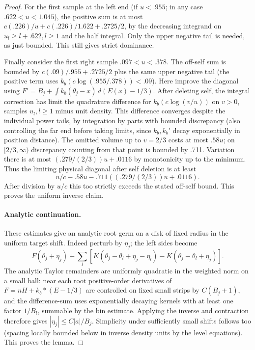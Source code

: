 \documentclass[11pt]{article}
\numberwithin{equation}{section}
\theoremstyle{definition}\newtheorem{definition}[theorem]{Definition}
\theoremstyle{remark}\newtheorem{remark}[theorem]{Remark}
\begin{document}
\begin{proof}
For the first sample at the left end (if \(u<.955\); in any case \(.622<u<1.045\)), the positive sum is at most \(c(.226)/u+c(.226)/1.622+.2725/2\), by the decreasing integrand on \(u_l\ge l+.622, l\ge1\) and the half integral. Only the upper negative tail is needed, as just bounded. This still gives strict dominance.

Finally consider the first right sample \(.097<u<.378\). The off-self sum is bounded by \(c(.09)/.955+.2725/2\) plus the same upper negative tail (the positive term uses \(k_b(c\log(.955/.378))<.09\)). Here improve the diagonal using
\(F'=B_j+\int k_b(\theta_j-x)\,d(E(x)-1/3)\).
After deleting self, the integral correction has limit the quadrature difference for \(k_b(c\log(v/u))\) on \(v>0\), samples \(u_l,l\ge1\) minus unit density. This difference converges despite the individual power tails, by integration by parts with bounded discrepancy (also controlling the far end before taking limits, since \(k_b,k_b'\) decay exponentially in position distance). The omitted volume up to \(v=2/3\) costs at most \(.58u\); on \([2/3,\infty)\) discrepancy counting from that point is bounded by .711. Variation there is at most \((.279/(2/3))u+.0116\) by monotonicity up to the minimum. Thus the limiting physical diagonal after self deletion is at least
\[
 u/c-.58u-.711((.279/(2/3))u+.0116).
\]
After division by \(u/c\) this too strictly exceeds the stated off-self bound. This proves the uniform inverse claim.

\paragraph{Analytic continuation.}
These estimates give an analytic root germ on a disk of fixed radius in the uniform target shift. Indeed perturb by \(\eta_j\); the left sides become
\[
 F(\theta_j+\eta_j)+
 \sum_l [K(\theta_j-\theta_l+\eta_j-\eta_l)-K(\theta_j-\theta_l+\eta_j)].
\]
The analytic Taylor remainders are uniformly quadratic in the weighted norm on a small ball: near each root positive-order derivatives of \(F=nH+k_b*(E-1/3)\) are controlled on fixed small strips by \(C(B_j+1)\), and the difference-sum uses exponentially decaying kernels with at least one factor \(1/B_l\), summable by the bin estimate. Applying the inverse and contraction therefore gives \(|\eta_j|\le C|a|/B_j\). Simplicity under sufficiently small shifts follows too (spacing locally bounded below in inverse density units by the level equations). This proves the lemma.
\end{proof}
\end{document}
